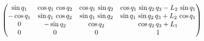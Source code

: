 $$\ifx\endpmatrix\undefined\pmatrix{\else\begin{pmatrix}\fi \sin 
 q_{1}&\cos q_{1}\,\cos q_{2}&\cos q_{1}\,\sin q_{2}&\cos q_{1}\,
 \sin q_{2}\,q_{3}-L_{2}\,\sin q_{1}\cr -\cos q_{1}&\sin q_{1}\,\cos 
 q_{2}&\sin q_{1}\,\sin q_{2}&\sin q_{1}\,\sin q_{2}\,q_{3}+L_{2}\,
 \cos q_{1}\cr 0&-\sin q_{2}&\cos q_{2}&\cos q_{2}\,q_{3}+L_{1}\cr 0&
 0&0&1\cr \ifx\endpmatrix\undefined}\else\end{pmatrix}\fi $$
